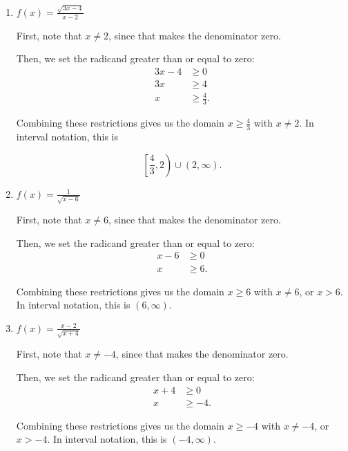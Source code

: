 \documentclass{ximera}
\begin{document}
\begin{enumerate}
	\item $f(x) = \frac{\sqrt{3x - 4}}{x - 2}$
		\begin{expandable}
			\begin{explanation}
First, note that $x \ne 2$, since that makes the denominator zero.

Then, we set the radicand greater than or equal to zero: \begin{align*}3x-4&\ge 0 \\ 3x & \ge 4 \\ x & \ge \frac{4}{3}. \end{align*}

Combining these restrictions gives us the domain $x \ge \frac{4}{3}$ with $x \ne 2$. In interval notation, this is

$$\left[\frac{4}{3}, 2\right) \cup (2, \infty).$$
			\end{explanation}
		\end{expandable}
	\item $f(x) = \frac{1}{\sqrt{x - 6}}$
		\begin{expandable}
			\begin{explanation}

First, note that $x \ne 6$, since that makes the denominator zero.

Then, we set the radicand greater than or equal to zero: \begin{align*}x-6&\ge 0 \\ x & \ge 6. \end{align*}

Combining these restrictions gives us the domain $x \ge 6$ with $x \ne 6$, or $x > 6$. In interval notation, this is $(6, \infty)$.
			\end{explanation}
		\end{expandable}
	\item $f(x) = \frac{x - 2}{\sqrt{x + 4}}$
		\begin{expandable}
			\begin{explanation}
First, note that $x \ne -4$, since that makes the denominator zero.

Then, we set the radicand greater than or equal to zero: \begin{align*}x + 4&\ge 0 \\ x & \ge -4. \end{align*}

Combining these restrictions gives us the domain $x \ge -4$ with $x \ne -4$, or $x > -4$. In interval notation, this is $(-4, \infty)$.


\end{explanation}
\end{expandable}
\end{enumerate}
\end{document}
